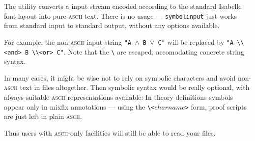 The  utility converts a input stream encoded
according to the standard Isabelle font layout into pure
\textsc{ascii} text. There is no usage --- \texttt{symbolinput} just
works from standard input to standard output, without any options
available.

\medskip For example, the non-\textsc{ascii} input string \texttt{"A
  $\land$ B $\lor$ C"} will be replaced by \verb|"A \\<and> B \\<or> C"|.
Note that the \verb|\| are escaped, accomodating concrete {\ML} string
syntax.

\medskip In many cases, it might be wise not to rely on symbolic
characters and avoid non-\textsc{ascii} text in files altogether. Then
symbolic syntax would be really optional, with always suitable
\textsc{ascii} representations available: In theory definitions
symbols appear only in mixfix annotations --- using the
\verb|\<|$charname$\verb|>| form, proof scripts are just left in plain
\textsc{ascii}.

Thus users with \textsc{ascii}-only facilities will still be able to
read your files.


%
